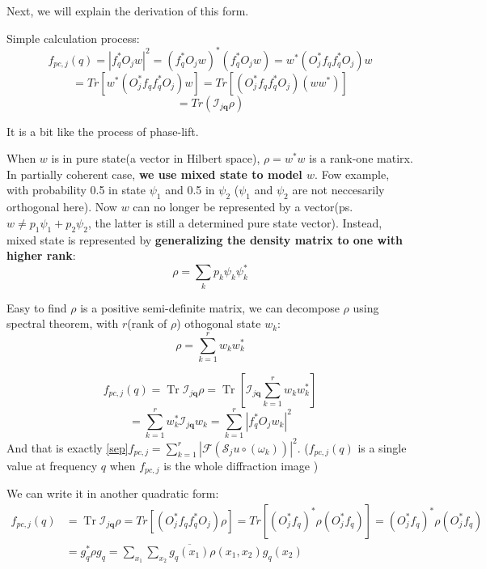 \documentclass{article}
\numberwithin{equation}{section}
\begin{document}
Next, we will explain the derivation of this form.

 Simple calculation process:
$$
f_{pc,j}(q) = |f_q^*O_j w|^2 = (f_q^*O_j w)^*(f_q^*O_j w) = w^*(O_j^*f_qf_q^*O_j)w
$$
$$
=Tr[w^*(O_j^*f_qf_q^*O_j)w]=Tr[(O_j^*f_qf_q^*O_j) (ww^*)]
$$
$$
=Tr(  \mathcal{I}_{j \mathbf{q}} \rho )
$$





It is a bit like the process of phase-lift. 



When $w$ is in pure state(a vector in Hilbert space), $\rho=w^*w$ is a rank-one matirx. In partially coherent case, \textbf{we use mixed state to model $w$}. Fow example, with probability 0.5 in state $\psi_1$ and 0.5 in $\psi_2$ ($\psi_1$ and $\psi_2$ are not neccesarily orthogonal here). Now $w$ can no longer be represented by a vector(ps. $w \neq p_1\psi_1 + p_2 \psi_2$, the latter is still a determined pure state vector). Instead, mixed state is represented by \textbf{generalizing the density matrix to one with higher rank}: 
$$
\rho = \sum_k p_k \psi_k \psi_k^*
$$



Easy to find $\rho$ is a positive semi-definite matrix, we can decompose $\rho$ using spectral theorem, with $r$(rank of $\rho$) othogonal state $w_k$:
\begin{equation}
\label{ort}
\rho = \sum_{k=1}^{r} w_k w_k^*
\end{equation}



$$
 f_{pc,j}(q) = \operatorname{Tr} \mathcal{I}_{j \mathbf{q}} \rho
 = \operatorname{Tr}[ \mathcal{I}_{j \mathbf{q}}  \sum_{k=1}^{r} w_k w_k^*]
$$
$$
=
\sum_{k=1}^r w_k^*\mathcal{I}_{j \mathbf{q}} w_k 
=
\sum_{k=1}^r |f_q^*O_j w_k|^2 
$$
And that is exactly \eqref{sep}$
 f_{pc,j}=\sum_{k=1}^r \left|\mathcal{F}\left( \mathcal{S}_{j} u \circ \left(\omega_k\right) \right)\right|^{2}  
$. ($f_{pc,j}(q)$ is a single value at frequency $q$ when $f_{pc,j}$ is the whole diffraction image )

We can write it in another quadratic form:
\begin{equation}
\label{quadratic}
\begin{aligned}
 f_{pc,j}(q) &=  \operatorname{Tr} \mathcal{I}_{j \mathbf{q}} \rho =Tr[(O_j^*f_qf_q^*O_j)\rho]
 = Tr[(O_j^*f_q)^*\rho (O_j^*f_q)] = (O_j^*f_q)^*\rho (O_j^*f_q) \\
 &= g_q^* \rho g_q = \sum_{x_1} \sum _{x_2}  \overline{g_q(x_1)} \rho(x_1,x_2) g_q(x_2)
 \end{aligned}
\end{equation}
\end{document}
